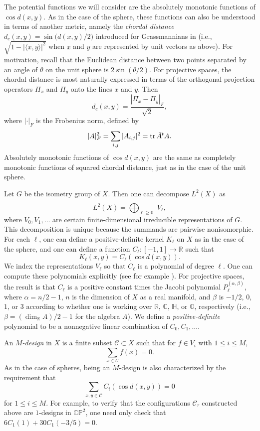 \documentclass{jams-l}
\theoremstyle{plain}
\numberwithin{theorem}{section}
\theoremstyle{definition}
\numberwithin{equation}{section}
\newcommand{\R}{{\mathbb R}}
\newcommand{\C}{{\mathbb C}}
\newcommand{\Oc}{{\mathbb O}}
\newcommand{\Ha}{{\mathbb H}}
\newcommand{\Proj}{{\mathbb P}}
\newcommand{\tr}{\mathop{\textup{tr}}\nolimits}
\newcommand{\CodeS}{\mathcal{C}}
\newcommand{\co}{\colon}
\begin{document}
The potential functions we will consider are the absolutely
monotonic functions of $\cos d(x,y)$.  As in the case of the
sphere, these functions can also be understood in terms of another
metric, namely the \textit{chordal distance\/} $d_c(x,y) =
\sin\big(d(x,y)/2\big)$ introduced for Grassmannians in \cite{CHS}
(i.e., $\sqrt{1-|\langle x,y\rangle|^2}$ when $x$ and $y$ are
represented by unit vectors as above). For motivation, recall that
the Euclidean distance between two points separated by an angle of
$\theta$ on the unit sphere is $2\sin (\theta/2)$. For projective
spaces, the chordal distance is most naturally expressed in terms
of the orthogonal projection operators $\Pi_x$ and $\Pi_y$ onto
the lines $x$ and $y$.  Then
$$
d_c(x,y) = \frac{|\Pi_x - \Pi_y|_F}{\sqrt{2}},
$$
where $|\cdot|_F$ is the Frobenius norm, defined by
$$
|A|_F^2 = \sum_{i,j} |A_{i,j}|^2 = \tr \bar{A}^t A.
$$
Absolutely monotonic functions of $\cos d(x,y)$ are the same as
completely monotonic functions of squared chordal distance, just
as in the case of the unit sphere.

Let $G$ be the isometry group of $X$.  Then one can decompose
$L^2(X)$ as
$$
L^2(X) = \widehat{\bigoplus_{\ell \ge 0}} \,\, V_\ell,
$$
where $V_0,V_1,\dots$ are certain finite-dimensional irreducible
representations of $G$. This decomposition is unique because the
summands are pairwise nonisomorphic. For each $\ell$, one can
define a positive-definite kernel $K_\ell$ on $X$ as in the case
of the sphere, and one can define a 
function $C_\ell \co [-1,1] \to \R$ such that
$$
K_\ell(x,y) = C_\ell(\cos d(x,y)).
$$
We index the representations $V_\ell$ so that $C_\ell$ is a
polynomial of degree $\ell$.  One can compute these polynomials
explicitly (see for example \cite[p.~178]{G}). For projective
spaces, the result is that $C_\ell$ is a positive constant times
the Jacobi polynomial $P^{(\alpha,\beta)}_\ell$, where $\alpha =
n/2-1$, $n$ is the dimension of $X$ as a real manifold, and
$\beta$ is $-1/2$, $0$, $1$, or $3$ according to whether one is
working over $\R$, $\C$, $\Ha$, or $\Oc$, respectively (i.e.,
$\beta = (\dim_\R A)/2-1$ for the algebra $A$). We define a
\textit{positive-definite} polynomial to be a nonnegative linear
combination of $C_0,C_1,\dots$.

An \textit{$M$-design\/} in $X$ is a finite subset $\CodeS \subset
X$ such that for $f \in V_i$ with $1 \le i \le M$,
$$
\sum_{x \in \CodeS} f(x) = 0.
$$
As in the case of spheres, being an $M$-design is also
characterized by the requirement that
$$
\sum_{x,y \in \CodeS} C_i(\cos d(x,y)) = 0
$$
for $1 \le i \le M$.  For example, to verify that the
configurations $\mathcal{C}_\tau$ constructed above are
$1$-designs in $\C\Proj^2$, one need only check that $6 C_1(1) +
30 C_1(-3/5)=0$.
\end{document}
